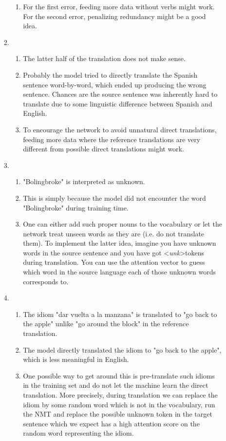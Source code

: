 \documentclass[12pt]{article}
\begin{document}
\begin{enumerate}[label=\textbf{\arabic*.}]
\begin{enumerate}[label=(\alph*)]
\begin{enumerate}[label=\roman*.]
\begin{enumerate}[label=\arabic*.]
        \item For the first error, feeding more data without verbs might work. For the second error, penalizing redundancy might be a good idea.
      \end{enumerate}
      \item
      \begin{enumerate}[label=\arabic*.]
        \item The latter half of the translation does not make sense.
        \item Probably the model tried to directly translate the Spanish sentence word-by-word, which ended up producing the wrong sentence. Chances are the source sentence was inherently hard to translate due to some linguistic difference between Spanish and English.
        \item To encourage the network to avoid unnatural direct translations, feeding more data where the reference translations are very different from possible direct translations might work.
      \end{enumerate}
      \item
      \begin{enumerate}[label=\arabic*.]
        \item "Bolingbroke" is interpreted as unknown.
        \item This is simply because the model did not encounter the word "Bolingbroke" during training time.
        \item One can either add such proper nouns to the vocabulary or let the network treat unseen words as they are (i.e. do not translate them). To implement the latter idea, imagine you have unknown words in the source sentence and you have got \textless\textit{unk}\textgreater tokens during translation. You can use the attention vector to guess which word in the source language each of those unknown words corresponds to.
      \end{enumerate}
      \item
      \begin{enumerate}[label=\arabic*.]
        \item The idiom "dar vuelta a la manzana" is translated to "go back to the apple" unlike "go around the block" in the reference translation.
        \item The model directly translated the idiom to "go back to the apple", which is less meaningful in English.
        \item One possible way to get around this is pre-translate such idioms in the training set and do not let the machine learn the direct translation. More precisely, during translation we can replace the idiom by some random word which is not in the vocabulary, run the NMT and replace the possible unknown token in the target sentence which we expect has a high attention score on the random word representing the idiom.

\end{enumerate}
\end{enumerate}
\end{enumerate}
\end{enumerate}
\end{document}
